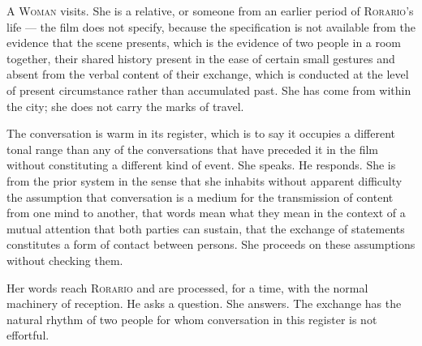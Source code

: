 \documentclass[12pt, oneside]{article}
\newenvironment{action}{%
  \vspace{0.6em}%
  \noindent\ignorespaces%
}{%
  \par\vspace{0.6em}%
}
\begin{document}
\begin{action}
A \textsc{Woman} visits. She is a relative, or someone from an earlier period of \textsc{Rorario}'s life --- the film does not specify, because the specification is not available from the evidence that the scene presents, which is the evidence of two people in a room together, their shared history present in the ease of certain small gestures and absent from the verbal content of their exchange, which is conducted at the level of present circumstance rather than accumulated past. She has come from within the city; she does not carry the marks of travel.

The conversation is warm in its register, which is to say it occupies a different tonal range than any of the conversations that have preceded it in the film without constituting a different kind of event. She speaks. He responds. She is from the prior system in the sense that she inhabits without apparent difficulty the assumption that conversation is a medium for the transmission of content from one mind to another, that words mean what they mean in the context of a mutual attention that both parties can sustain, that the exchange of statements constitutes a form of contact between persons. She proceeds on these assumptions without checking them.

Her words reach \textsc{Rorario} and are processed, for a time, with the normal machinery of reception. He asks a question. She answers. The exchange has the natural rhythm of two people for whom conversation in this register is not effortful.
\end{action}
\end{document}
